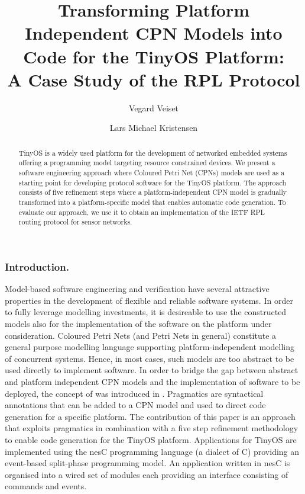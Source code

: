 \documentclass[a4paper]{llncs}
\title{Transforming Platform Independent CPN Models into Code for the TinyOS
  Platform: \\ A Case Study of the RPL Protocol}
\author{
  Vegard Veiset \and Lars Michael Kristensen
}
\institute{
  Department of Computing, Bergen University College \\
  Email: \email{vegard.veiset@stud.hib.no,lmkr@hib.no}
}
\begin{document}
\maketitle

\begin{abstract}

TinyOS is a widely used platform for the development of networked
embedded systems offering a programming model targeting resource
constrained devices. We present a software engineering approach where
Coloured Petri Net (CPNs) models are used as a starting point for
developing protocol software for the TinyOS platform. The approach
consists of five refinement steps where a platform-independent CPN
model is gradually transformed into a platform-specific model that
enables automatic code generation. To evaluate our approach, we use it
to obtain an implementation of the IETF RPL routing protocol for
sensor networks.


\end{abstract}

\subsubsection{Introduction.} Model-based software engineering and verification  have several attractive properties in the development of flexible and reliable
software systems. In order to fully leverage modelling investments, it
is desireable to use the constructed models also for the
implementation of the software on the platform under
consideration. Coloured Petri Nets \cite{CPNsttt} (and Petri Nets in
general) constitute a general purpose modelling language supporting
platform-independent modelling of concurrent systems. Hence, in most
cases, such models are too abstract to be used directly to implement
software. In order to bridge the gap between abstract and platform
independent CPN models and the implementation of software to be
deployed, the concept of  was introduced in
\cite{NWPTpaper}. Pragmatics are syntactical annotations that can be
added to a CPN model and used to direct code generation for a specific
platform. The contribution of this paper is an approach
\cite{veisetthesis} that exploits pragmatics in combination with a
five step refinement methodology to enable code generation for the
TinyOS platform. Applications for TinyOS \cite{LevisTinyOS} are
implemented using the nesC programming language (a dialect of C)
providing an event-based split-phase programming model. An application
written in nesC is organised into a wired set of modules each
providing an interface consisting of commands and events.
\end{document}
